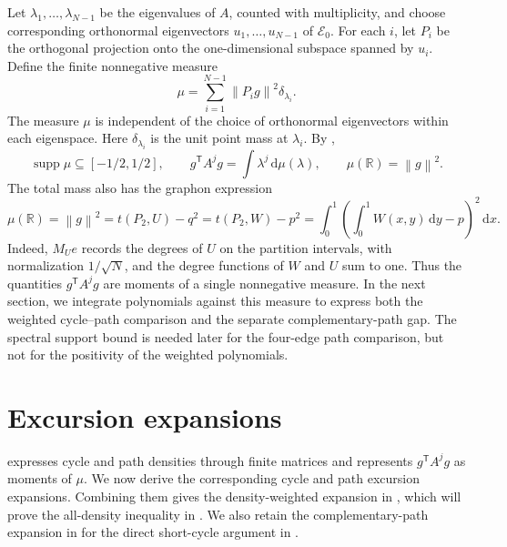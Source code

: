 \documentclass[11pt]{article}
\numberwithin{equation}{section}
\newcommand{\R}{\mathbb R}
\newcommand{\norm}[1]{\left\lVert #1\right\rVert}
\newcommand{\dd}{\,\mathrm d}
\newcommand{\supp}{\operatorname{supp}}
\newcommand{\tP}[2]{t(P_{#1},#2)}
\begin{document}
Let $\lambda_1,\ldots,\lambda_{N-1}$ be the eigenvalues of $A$, counted
with multiplicity, and choose corresponding orthonormal eigenvectors
$u_1,\ldots,u_{N-1}$ of $\mathcal E_0$. For each $i$, let $P_i$ be the
orthogonal projection onto the one-dimensional subspace spanned by $u_i$.
Define the finite nonnegative measure
\begin{equation*}
  \mu=\sum_{i=1}^{N-1}\norm{P_ig}^2\delta_{\lambda_i}.
\end{equation*}
The measure $\mu$ is independent of the choice of orthonormal eigenvectors
within each eigenspace.  Here $\delta_{\lambda_i}$ is the unit point mass
at $\lambda_i$.  By ,
\begin{equation}\label{eq:moments}
  \supp\mu\subseteq[-1/2,1/2],
  \qquad
  g^{\mathsf T}A^jg=\int\lambda^j\dd\mu(\lambda),
  \qquad
  \mu(\R)=\norm g^2.
\end{equation}
The total mass also has the graphon expression
\begin{equation}\label{eq:degree-variance-mass}
  \mu(\R)=\norm g^2
    =\tP2U-q^2=\tP2W-p^2
    =\int_0^1\left(\int_0^1W(x,y)\dd y-p\right)^2\dd x.
\end{equation}
Indeed, $M_Ue$ records the degrees of $U$ on the partition intervals,
with normalization $1/\sqrt N$, and the degree functions of $W$ and
$U$ sum to one. Thus the quantities $g^{\mathsf T}A^jg$ are moments
of a single nonnegative measure. In the next section, we integrate
polynomials against this measure to express both the weighted
cycle--path comparison and the separate complementary-path gap.
The spectral support bound is needed later for the four-edge path
comparison, but not for the positivity of the weighted polynomials.

\section{Excursion expansions}
\label{sec:excursions}

 expresses cycle and path densities through
finite matrices and represents $g^{\mathsf T}A^jg$ as moments of
$\mu$. We now derive the corresponding cycle and path excursion
expansions. Combining them gives the density-weighted expansion in
, which will prove the all-density
inequality in . We also retain the
complementary-path expansion in  for
the direct short-cycle argument in .
\end{document}
